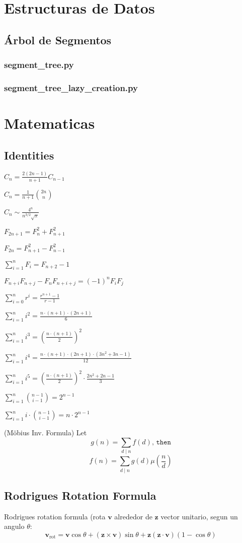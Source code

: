 \documentclass{article}
\newcommand\codefile[2]{    
    \subsubsection{#2}
    
    
}
\begin{document}
\begin{multicols*}{2}
\section{Estructuras de Datos}

\subsection{Árbol de Segmentos}
\codefile{estructuras\_de\_datos/segment\_tree.py}{segment\_tree.py}
\codefile{estructuras\_de\_datos/segment\_tree\_lazy\_creation.py}{segment\_tree\_lazy\_creation.py}

\section{Matematicas}
\subsection{Identities}
    $C_n = \frac{2(2n-1)}{n+1} C_{n-1}$

    $C_n = \frac{1}{n+1} \binom{2n}{n}$

    $C_n \sim \frac{4^n}{n^{3/2}\sqrt{\pi}}$

    $F_{2n+1} = F_{n}^2 + F_{n+1}^2$

    $F_{2n} = F_{n+1}^2 - F_{n-1}^2$

    $\sum_{i=1}^n F_i = F_{n+2}-1$

    $F_{n+i}F_{n+j} - F_nF_{n+i+j} = (-1)^n F_iF_j$

    $\sum_{i=0}^n{r^i} = \frac{r^{n+1}-1}{r-1}$
    
    $\sum_{i=1}^n{i^2} = \frac{n\cdot(n+1)\cdot(2n+1)}{6}$

    $\sum_{i=1}^n{i^3} = \left(\frac{n\cdot(n+1)}{2}\right)^2$

    $\sum_{i=1}^n{i^4} = \frac{n\cdot(n+1)\cdot(2n+1)\cdot(3n^2+3n-1)}{12}$

    $\sum_{i=1}^{ n} i^5 = \left(\frac{ n \cdot (n+1)}{2}\right) ^2 \cdot \frac{2 n ^2 + 2n - 1}{3}$

    $\sum_{i=1}^n{\binom{n-1}{i-1}} = 2^{n-1}$

    $\sum_{i=1}^n{i\cdot\binom{n-1}{i-1}} = n\cdot2^{n-1}$

    (Möbius Inv. Formula)
    Let
    \[g(n) = \sum_{d\mid n} f(d) \texttt{, then}\]
    \[f(n)=\sum_{d\mid n} g(d) \mu\left(\frac{n}{d}\right)\]


\subsection{Rodrigues Rotation Formula}
Rodrigues rotation formula (rota $\mathbf{v}$ alrededor de $\mathbf{z}$ vector unitario, segun un angulo $\theta$:
$$\mathbf{v}_\mathrm{rot} = \mathbf{v} \cos\theta + (\mathbf{z} \times \mathbf{v})\sin\theta   + \mathbf{z} (\mathbf{z} \cdot \mathbf{v}) (1 - \cos\theta)$$


\end{multicols*}
\end{document}
